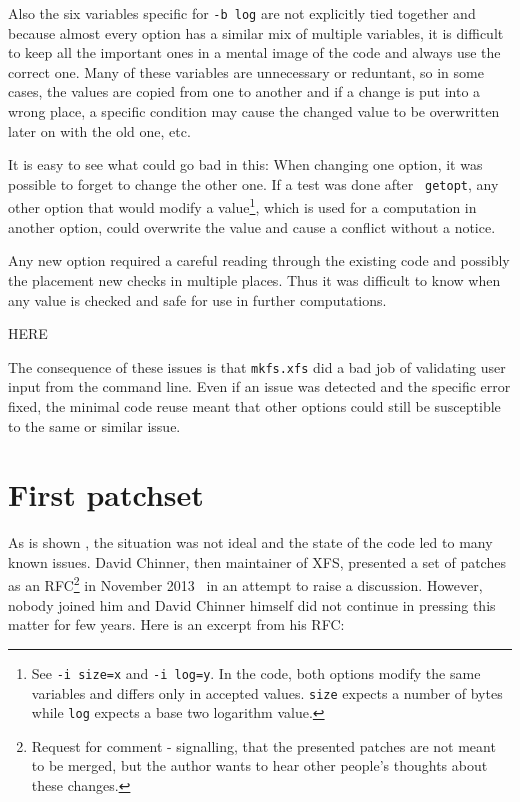Also the six variables specific for {\tt -b log} are not explicitly tied
together and because almost every option has a similar mix of multiple
variables, it is difficult to keep all the important ones in a mental image
of the code and always use the correct one. Many of these variables are
unnecessary or reduntant, so in some cases, the values are copied from one
to another and if a change is put into a wrong place, a specific condition
may cause the changed value to be overwritten later on with the old one,
etc.

It is easy to see what could go bad in this: When changing one option, it was
possible to forget to change the other one. If a test was done after {\tt
getopt}, any other option that would modify a value\footnote{See {\tt -i
size=x} and {\tt -i log=y}. In the code, both options modify the same variables
and differs only in accepted values. {\tt size} expects a number of bytes while
{\tt log} expects a base two logarithm value.}, which is used for a computation
in another option, could overwrite the value and cause a conflict without a
notice.

Any new option required a careful reading through the existing code and
possibly the placement new checks in multiple places. Thus it was difficult to know
when any value is checked and safe for use in further computations.

HERE


The consequence of these issues is that {\tt mkfs.xfs} did a bad job of
validating user input from the command line. Even if an issue was detected
and the specific error fixed, the minimal code reuse meant that other
options could still be susceptible to the same or similar issue.

\section{First patchset}\label{chap:refactoring:first}

As is shown , the situation was not ideal and the
state of the code led to many known issues. David Chinner, then maintainer
of XFS, presented a set of patches as an RFC\footnote{Request for comment -
	signalling, that the presented patches are not meant to be merged,
but the author wants to hear other people's thoughts about these changes.}
in November 2013~\cite{davidsPatches} in an attempt to raise a discussion.
However, nobody joined him and David Chinner himself did not continue in
pressing this matter for few years. Here is an excerpt from his RFC:

